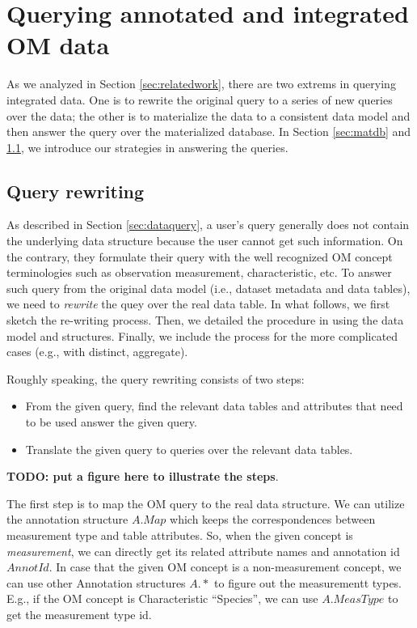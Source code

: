 \documentclass[conference]{IEEEtran}
\begin{document}
\section{Querying annotated and integrated OM data}

As we analyzed in Section \ref{sec:relatedwork}, there are two extrems
in querying integrated data. 
One is to rewrite the original query to a series of new queries over
the data; the other is to materialize the data to a consistent data
model and then answer the query over the materialized database. 
In Section \ref{sec:matdb} and \ref{sec:queryrewrite}, we introduce
our strategies in answering the queries. 


\subsection{Query rewriting}\label{sec:queryrewrite}

As described in Section \ref{sec:dataquery}, 
a user's query generally does not contain the underlying data
structure because the user cannot get such information. 
On the contrary, they formulate their query with the well recognized
OM concept terminologies such as observation
measurement, characteristic, etc. 
To answer such query from the original data model (i.e., dataset
metadata and data tables), we need to {\em rewrite} the quey over the
real data table. 
In what follows, we first sketch the re-writing process. Then, we
detailed the procedure in using the data model and
structures. Finally, we include the process for the more complicated
cases (e.g., with distinct, aggregate). 

Roughly speaking, the query rewriting consists of two steps:
\begin{itemize}
\item From the given query, find the relevant data tables and
  attributes that need to be used answer the given query. 
\item Translate the given query to queries over the relevant data
  tables. 
\end{itemize}

{\bf TODO: put a figure here to illustrate the steps}. 

The first step is to map the OM query to the real data structure. 
We can utilize the annotation structure $A.Map$ which keeps the correspondences between
measurement type and table attributes. 
So, when the given concept is {\em measurement}, we can directly get
its related attribute names and annotation id $AnnotId$. 
In case that the given OM concept is a non-measurement concept, we can use
other Annotation structures $A.*$ to figure out the measurementt types. 
E.g., if the OM concept is Characteristic ``Species'', we can use
$A.MeasType$ to get the measurement type id. 
\end{document}
